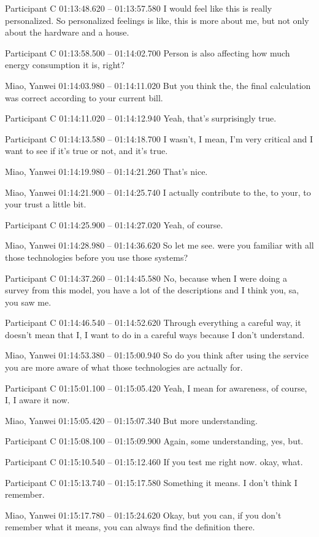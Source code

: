 {Participant C 01:13:48.620 -- 01:13:57.580
I would feel like this is really personalized. So personalized feelings is like, this is more about me, but not only about the hardware and a house.

Participant C 01:13:58.500 -- 01:14:02.700
Person is also affecting how much energy consumption it is, right?

Miao, Yanwei 01:14:03.980 -- 01:14:11.020
But you think the, the final calculation was correct according to your current bill.

Participant C 01:14:11.020 -- 01:14:12.940
Yeah, that's surprisingly true.

Participant C 01:14:13.580 -- 01:14:18.700
I wasn't, I mean, I'm very critical and I want to see if it's true or not, and it's true.

Miao, Yanwei 01:14:19.980 -- 01:14:21.260
That's nice.

Miao, Yanwei 01:14:21.900 -- 01:14:25.740
I actually contribute to the, to your, to your trust a little bit.

Participant C 01:14:25.900 -- 01:14:27.020
Yeah, of course.

Miao, Yanwei 01:14:28.980 -- 01:14:36.620
So let me see. were you familiar with all those technologies before you use those systems?

Participant C 01:14:37.260 -- 01:14:45.580
No, because when I were doing a survey from this model, you have a lot of the descriptions and I think you, sa, you saw me.

Participant C 01:14:46.540 -- 01:14:52.620
Through everything a careful way, it doesn't mean that I, I want to do in a careful ways because I don't understand.

Miao, Yanwei 01:14:53.380 -- 01:15:00.940
So do you think after using the service you are more aware of what those technologies are actually for.

Participant C 01:15:01.100 -- 01:15:05.420
Yeah, I mean for awareness, of course, I, I aware it now.

Miao, Yanwei 01:15:05.420 -- 01:15:07.340
But more understanding.

Participant C 01:15:08.100 -- 01:15:09.900
Again, some understanding, yes, but.

Participant C 01:15:10.540 -- 01:15:12.460
If you test me right now. okay, what.

Participant C 01:15:13.740 -- 01:15:17.580
Something it means. I don't think I remember.

Miao, Yanwei 01:15:17.780 -- 01:15:24.620
Okay, but you can, if you don't remember what it means, you can always find the definition there.

}

